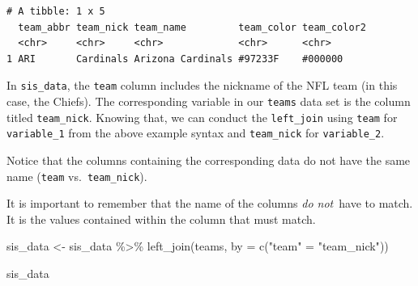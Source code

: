 \documentclass[
  letterpaper,
]{krantz}
\newenvironment{Shaded}{\begin{snugshade}}{\end{snugshade}}
\newcommand{\AttributeTok}[1]{\textcolor[rgb]{0.40,0.45,0.13}{#1}}
\newcommand{\FunctionTok}[1]{\textcolor[rgb]{0.28,0.35,0.67}{#1}}
\newcommand{\NormalTok}[1]{\textcolor[rgb]{0.00,0.23,0.31}{#1}}
\newcommand{\OtherTok}[1]{\textcolor[rgb]{0.00,0.23,0.31}{#1}}
\newcommand{\SpecialCharTok}[1]{\textcolor[rgb]{0.37,0.37,0.37}{#1}}
\newcommand{\StringTok}[1]{\textcolor[rgb]{0.13,0.47,0.30}{#1}}
\begin{document}
\begin{verbatim}
# A tibble: 1 x 5
  team_abbr team_nick team_name         team_color team_color2
  <chr>     <chr>     <chr>             <chr>      <chr>      
1 ARI       Cardinals Arizona Cardinals #97233F    #000000    
\end{verbatim}

In \texttt{sis\_data}, the \texttt{team} column includes the nickname of
the NFL team (in this case, the Chiefs). The corresponding variable in
our \texttt{teams} data set is the column titled \texttt{team\_nick}.
Knowing that, we can conduct the \texttt{left\_join} using \texttt{team}
for \texttt{variable\_1} from the above example syntax and
\texttt{team\_nick} for \texttt{variable\_2}.

\begin{tcolorbox}[enhanced jigsaw, left=2mm, toprule=.15mm, opacitybacktitle=0.6, leftrule=.75mm, bottomrule=.15mm, colbacktitle=quarto-callout-tip-color!10!white, breakable, colback=white, bottomtitle=1mm, toptitle=1mm, title=\textcolor{quarto-callout-tip-color}{\faLightbulb}\hspace{0.5em}{Tip}, coltitle=black, titlerule=0mm, arc=.35mm, opacityback=0, colframe=quarto-callout-tip-color-frame, rightrule=.15mm]

Notice that the columns containing the corresponding data do not have
the same name (\texttt{team} vs.~\texttt{team\_nick}).

It is important to remember that the name of the columns \emph{do
not}~have to match. It is the values contained within the column that
must match.

\end{tcolorbox}

\begin{Shaded}
\begin{Highlighting}[]
\NormalTok{sis\_data }\OtherTok{\textless{}{-}}\NormalTok{ sis\_data }\SpecialCharTok{\%\textgreater{}\%}
  \FunctionTok{left\_join}\NormalTok{(teams, }\AttributeTok{by =} \FunctionTok{c}\NormalTok{(}\StringTok{"team"} \OtherTok{=} \StringTok{"team\_nick"}\NormalTok{))}

\NormalTok{sis\_data}
\end{Highlighting}
\end{Shaded}
\end{document}
